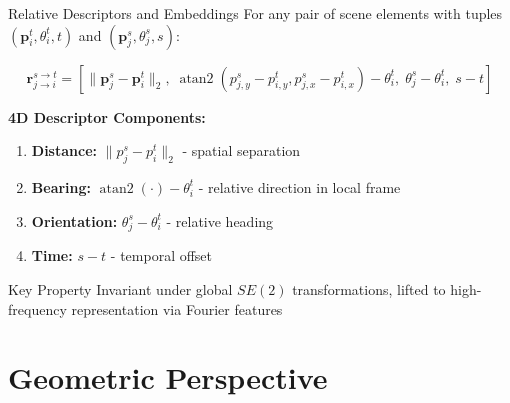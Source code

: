 \documentclass[10pt,aspectratio=169]{beamer}
\DeclareMathOperator{\atan}{atan2}
\begin{document}
\begin{frame}{Relative Descriptors and Embeddings}
For any pair of scene elements with tuples $(\mathbf{p}_i^t, \theta_i^t, t)$ and $(\mathbf{p}_j^s, \theta_j^s, s)$:

\begin{equation}
\mathbf{r}_{j\to i}^{s\to t} = \left[
    \|\mathbf{p}_j^s-\mathbf{p}_i^t\|_2,\;
    \atan(p_{j,y}^s-p_{i,y}^t, p_{j,x}^s-p_{i,x}^t)-\theta_i^t,\;
    \theta_j^s-\theta_i^t,\;
    s-t
\right]
\end{equation}

\vspace{0.5cm}

\textbf{4D Descriptor Components:}    \begin{enumerate}
    \item \textbf{Distance:} $\|p_j^s-p_i^t\|_2$ - spatial separation
    \item \textbf{Bearing:} $\atan(\cdot)-\theta_i^t$ - relative direction in local frame
    \item \textbf{Orientation:} $\theta_j^s-\theta_i^t$ - relative heading
    \item \textbf{Time:} $s-t$ - temporal offset
\end{enumerate}

\begin{block}{Key Property}
Invariant under global $SE(2)$ transformations, lifted to high-frequency representation via Fourier features
\end{block}
\end{frame}

\section{Geometric Perspective}
\end{document}
